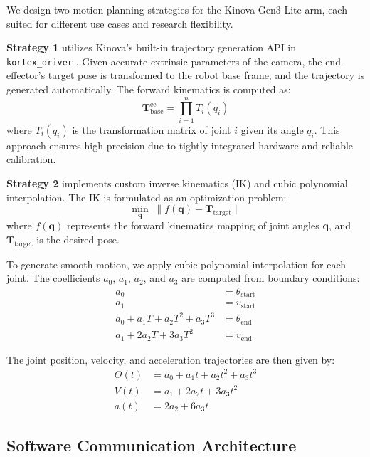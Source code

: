 \documentclass[conference]{IEEEtran}
\begin{document}
We design two motion planning strategies for the Kinova Gen3 Lite arm, each suited for different use cases and research flexibility.

\textbf{Strategy 1} utilizes Kinova's built-in trajectory generation API in \texttt{kortex\_driver} \cite{b4}. Given accurate extrinsic parameters of the camera, the end-effector's target pose is transformed to the robot base frame, and the trajectory is generated automatically. The forward kinematics is computed as:
\begin{equation}
	\mathbf{T}_{\text{base}}^{\text{ee}} = \prod_{i=1}^{n} T_i(q_i)
\end{equation}
where $T_i(q_i)$ is the transformation matrix of joint $i$ given its angle $q_i$. This approach ensures high precision due to tightly integrated hardware and reliable calibration.

\textbf{Strategy 2} implements custom inverse kinematics (IK) and cubic polynomial interpolation. The IK is formulated as an optimization problem:
\begin{equation}
	\min_{\mathbf{q}} \; \| f(\mathbf{q}) - \mathbf{T}_{\text{target}} \|
\end{equation}
where $f(\mathbf{q})$ represents the forward kinematics mapping of joint angles $\mathbf{q}$, and $\mathbf{T}_{\text{target}}$ is the desired pose.

To generate smooth motion, we apply cubic polynomial interpolation for each joint. The coefficients $a_0$, $a_1$, $a_2$, and $a_3$ are computed from boundary conditions:
\begin{align}
	a_0 &= \theta_{\text{start}} \\
	a_1 &= v_{\text{start}} \\
	a_0 + a_1 T + a_2 T^2 + a_3 T^3 &= \theta_{\text{end}} \\
	a_1 + 2a_2 T + 3a_3 T^2 &= v_{\text{end}}
\end{align}

The joint position, velocity, and acceleration trajectories are then given by:
\begin{align}
	\Theta(t) &= a_0 + a_1 t + a_2 t^2 + a_3 t^3 \\
	V(t) &= a_1 + 2a_2 t + 3a_3 t^2 \\
	a(t) &= 2a_2 + 6a_3 t
\end{align}

\subsection{Software Communication Architecture}
\end{document}
